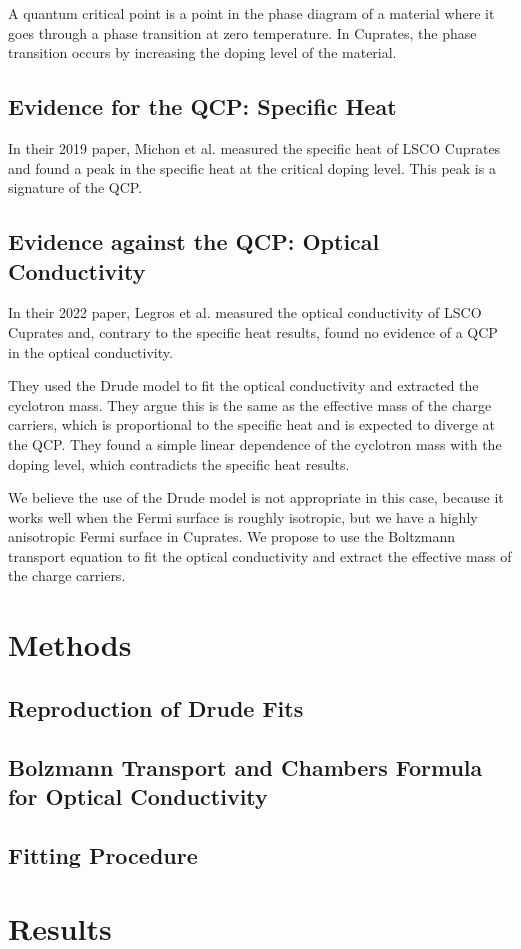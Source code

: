 \documentclass[12pt]{article}
\begin{document}
A quantum critical point is a point in the phase diagram of a material where it goes through a phase
transition at zero temperature. In Cuprates, the phase transition occurs by increasing the doping
level of the material.

\subsection{Evidence for the QCP: Specific Heat}
In their 2019 paper, Michon et al. measured the specific heat of LSCO Cuprates and found a peak
in the specific heat at the critical doping level. This peak is a signature of the QCP.

\subsection{Evidence against the QCP: Optical Conductivity}
In their 2022 paper, Legros et al. measured the optical conductivity of LSCO Cuprates and, contrary
to the specific heat results, found no evidence of a QCP in the optical conductivity.

They used the Drude model to fit the optical conductivity and extracted the cyclotron mass.
They argue this is the same as the effective mass of the charge carriers, which is proportional to
the specific heat and is expected to diverge at the QCP. They found a simple linear dependence of
the cyclotron mass with the doping level, which contradicts the specific heat results.

We believe the use of the Drude model is not appropriate in this case, because it works well when
the Fermi surface is roughly isotropic, but we have a highly anisotropic Fermi surface in Cuprates.
We propose to use the Boltzmann transport equation to fit the optical conductivity and extract the
effective mass of the charge carriers.

\section{Methods}
\subsection{Reproduction of Drude Fits}

\subsection{Bolzmann Transport and Chambers Formula for Optical Conductivity}

\subsection{Fitting Procedure}

\section{Results}
\end{document}
